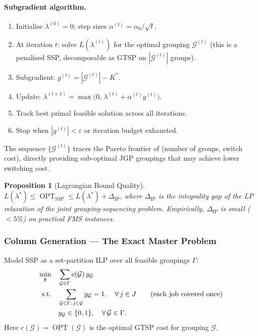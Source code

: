 \documentclass[11pt,a4paper]{article}
\theoremstyle{plain}
\newtheorem{proposition}[theorem]{Proposition}
\theoremstyle{definition}
\DeclareMathOperator{\OPT}{OPT}
\newcommand{\calG}{\mathcal{G}}     %
\newcommand{\Kstar}{K^{*}}          %
\begin{document}
\paragraph{Subgradient algorithm.}
\begin{enumerate}[label=\arabic*.]
  \item Initialise $\lambda^{(0)} = 0$; step sizes $\alpha^{(t)} = \alpha_0 / \sqrt{t}$.
  \item At iteration $t$: solve $L(\lambda^{(t)})$ for the optimal grouping $\calG^{(t)}$
        (this is a penalised SSP, decomposable as GTSP on $|\calG^{(t)}|$ groups).
  \item Subgradient: $g^{(t)} = |\calG^{(t)}| - \Kstar$.
  \item Update: $\lambda^{(t+1)} = \max\bigl(0,\, \lambda^{(t)} + \alpha^{(t)} g^{(t)}\bigr)$.
  \item Track best primal feasible solution across all iterations.
  \item Stop when $|g^{(t)}| < \varepsilon$ or iteration budget exhausted.
\end{enumerate}

The sequence $\{\calG^{(t)}\}$ traces the Pareto frontier of (number of groups, switch
cost), directly providing sub-optimal JGP groupings that may achieve lower switching cost.

\begin{thmbox}
\begin{proposition}[Lagrangian Bound Quality]
$L(\lambda^*) \le \OPT_{\text{SSP}} \le L(\lambda^*) + \Delta_{\mathrm{IP}}$,
where $\Delta_{\mathrm{IP}}$ is the integrality gap of the LP relaxation of the
joint grouping-sequencing problem.
Empirically, $\Delta_{\mathrm{IP}}$ is small ($< 5\%$) on practical FMS instances.
\end{proposition}
\end{thmbox}

\subsubsection{Column Generation --- The Exact Master Problem}
\label{sec:CG}

Model SSP as a set-partition ILP over all feasible groupings $\Gamma$:
\begin{align}
  \min_{\mathbf{y}} \quad & \sum_{\calG \in \Gamma} c(\calG)\, y_{\calG}
  \label{eq:master}\\
  \text{s.t.} \quad
  & \sum_{\calG \in \Gamma:\, j \in \calG} y_{\calG} = 1,
    \quad \forall\, j \in J
    \tag{each job covered once}\\
  & y_{\calG} \in \{0,1\},
    \quad \forall\, \calG \in \Gamma.
    \notag
\end{align}
Here $c(\calG) = \OPT(\calG)$ is the optimal GTSP cost for grouping $\calG$.
\end{document}
